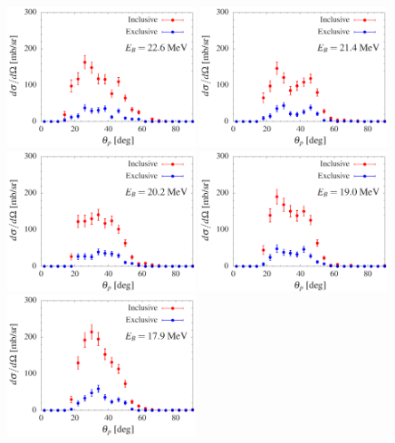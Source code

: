 \documentclass[aps,prc,onecolumn,amsmath,amssymb, preprint, 12pt]{revtex4-1}
\begin{document}
\begin{figure}[!ht]
\centering
\includegraphics[width=0.49\textwidth]{ad_130.eps}
\includegraphics[width=0.49\textwidth]{ad_140.eps}\\
\includegraphics[width=0.49\textwidth]{ad_150.eps}
\includegraphics[width=0.49\textwidth]{ad_160.eps}\\
\includegraphics[width=0.49\textwidth]{ad_170.eps}

\end{figure}
\end{document}
